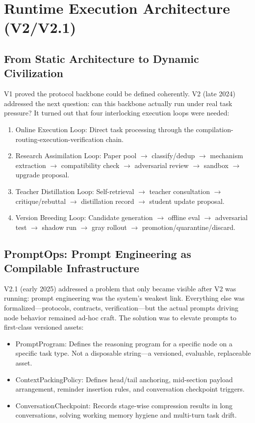 \documentclass[12pt,a4paper]{article}
\begin{document}
\section{Runtime Execution Architecture (V2/V2.1)}


\subsection{From Static Architecture to Dynamic Civilization}


V1 proved the protocol backbone could be defined coherently. V2 (late 2024) addressed the next question: can this backbone actually run under real task pressure? It turned out that four interlocking execution loops were needed:

\begin{enumerate}
  \item Online Execution Loop: Direct task processing through the compilation-routing-execution-verification chain.
  \item Research Assimilation Loop: Paper pool $\rightarrow$ classify/dedup $\rightarrow$ mechanism extraction $\rightarrow$ compatibility check $\rightarrow$ adversarial review $\rightarrow$ sandbox $\rightarrow$ upgrade proposal.
  \item Teacher Distillation Loop: Self-retrieval $\rightarrow$ teacher consultation $\rightarrow$ critique/rebuttal $\rightarrow$ distillation record $\rightarrow$ student update proposal.
  \item Version Breeding Loop: Candidate generation $\rightarrow$ offline eval $\rightarrow$ adversarial test $\rightarrow$ shadow run $\rightarrow$ gray rollout $\rightarrow$ promotion/quarantine/discard.
\end{enumerate}

\subsection{PromptOps: Prompt Engineering as Compilable Infrastructure}


V2.1 (early 2025) addressed a problem that only became visible after V2 was running: prompt engineering was the system's weakest link. Everything else was formalized---protocols, contracts, verification---but the actual prompts driving node behavior remained ad-hoc craft. The solution was to elevate prompts to first-class versioned assets:

\begin{itemize}
  \item PromptProgram: Defines the reasoning program for a specific node on a specific task type. Not a disposable string---a versioned, evaluable, replaceable asset.
  \item ContextPackingPolicy: Defines head/tail anchoring, mid-section payload arrangement, reminder insertion rules, and conversation checkpoint triggers.
  \item ConversationCheckpoint: Records stage-wise compression results in long conversations, solving working memory hygiene and multi-turn task drift.
\end{itemize}
\end{document}
